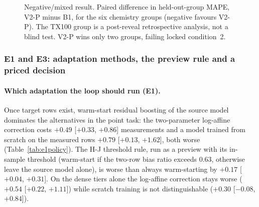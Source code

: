 \documentclass[11pt,a4paper]{article}
\newcommand{\tox}{TX100}
\begin{document}
\begin{figure}[t]
\centering
{}
\caption{Negative/mixed result. Paired difference in held-out-group MAPE,
V2-P minus B1, for the six chemistry groups (negative favours V2-P). The
\tox{} group is a post-reveal retrospective analysis, not a blind test. V2-P
wins only two groups, failing locked condition~2.}
\label{fig:v2paired}
\end{figure}

\subsubsection{E1 and E3: adaptation methods, the preview rule and a priced decision}
\label{sec:e3}
\paragraph{Which adaptation the loop should run (E1).} Once target rows exist, warm-start
residual boosting of the source model dominates the alternatives in the point task: the two-parameter
log-affine correction costs $+0.49$ [$+0.33$, $+0.86$] measurements and a model trained from scratch on the
measured rows $+0.79$ [$+0.13$, $+1.62$], both worse (Table~\ref{tab:e1policy}). The H-J threshold
rule, run as a preview with its in-sample threshold (warm-start if the two-row bias ratio exceeds
0.63, otherwise leave the source model alone), is worse than always warm-starting by
$+0.17$ [$+0.04$, $+0.31$]. On the dense tiers alone the log-affine correction stays worse
($+0.54$ [$+0.22$, $+1.11$]) while scratch training is not distinguishable
($+0.30$ [$-0.08$, $+0.84$]).
\end{document}
